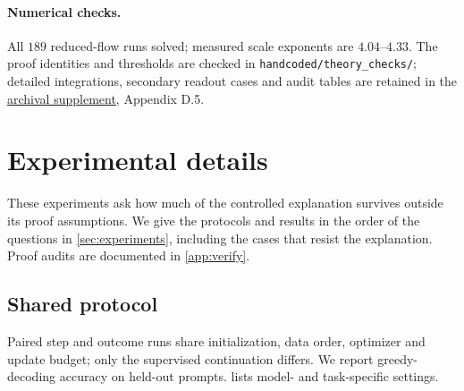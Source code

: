\paragraph{Numerical checks.}\label{app:J-generalK}
All $189$ reduced-flow runs solved; measured scale exponents are $4.04$--$4.33$.
The proof identities and thresholds are checked in
\nolinkurl{handcoded/theory_checks/}; detailed integrations, secondary readout
cases and audit tables are retained in the
\href{archival_full_version.pdf}{archival supplement}, Appendix D.5.

\section{Experimental details}
\label{app:experiments}
\label{app:experimental-details}
These experiments ask how much of the controlled explanation survives outside its proof assumptions. We give the protocols and
results in the order of the questions in \cref{sec:experiments}, including the cases that resist the explanation. Proof audits are documented in \cref{app:verify}.

\subsection{Shared protocol}
\label{app:letter-protocol}
Paired step and outcome runs share initialization, data order, optimizer and update budget; only the supervised continuation differs.
We report greedy-decoding accuracy on held-out prompts.  lists model- and task-specific settings.

\begin{table}[H]
\centering\small
{}
\caption{\textbf{Shared experimental settings.} Task-specific exceptions are stated in the corresponding subsections.}
\label{tab:protocol}
\end{table}

